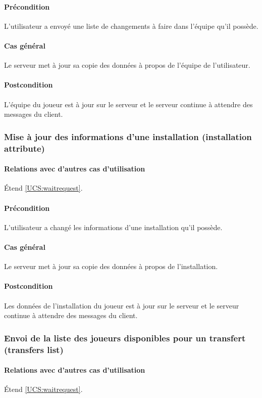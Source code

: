 	\paragraph{Précondition} L'utilisateur a envoyé une liste de changements à faire dans l'équipe qu'il possède.
    \paragraph{Cas général} Le \gls{serveur} met à jour sa copie des données à propos de l'équipe de l'utilisateur.
    \paragraph{Postcondition} L'équipe du joueur est à jour sur le serveur et le serveur continue à attendre des messages du \gls{client}.

\subsubsection{Mise à jour des informations d'une installation (installation attribute)}
	\label{UCS:updateinstallation}
	\paragraph{Relations avec d'autres cas d'utilisation} \'Etend \ref{UCS:waitrequest}.
	\paragraph{Précondition} L'utilisateur a changé les informations d'une installation qu'il possède.
    \paragraph{Cas général} Le \gls{serveur} met à jour sa copie des données à propos de l'installation.
    \paragraph{Postcondition} Les données de l'installation du joueur est à jour sur le serveur et le serveur continue à attendre des messages du \gls{client}.
    
\subsubsection{Envoi de la liste des joueurs disponibles pour un transfert (transfers list)}
	\label{UCS:sendtransfers}
	\paragraph{Relations avec d'autres cas d'utilisation} \'Etend \ref{UCS:waitrequest}.
